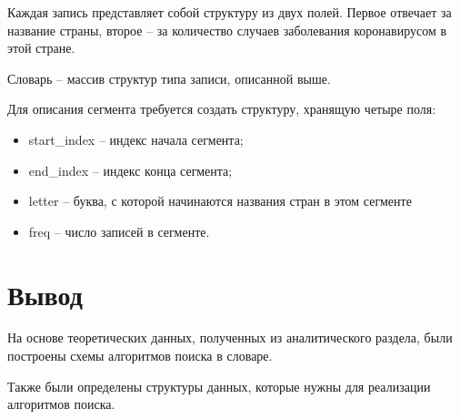 Каждая запись представляет собой структуру из двух полей. Первое отвечает за название страны, второе -- за количество случаев заболевания коронавирусом в этой стране.

Словарь -- массив структур типа записи, описанной выше.

Для описания сегмента требуется создать структуру, хранящую четыре поля:
\begin{itemize}
	\item start\_index -- индекс начала сегмента;
	\item end\_index -- индекс конца сегмента;
	\item letter -- буква, с которой начинаются названия стран в этом сегменте
	\item freq -- число записей в сегменте.
\end{itemize}

\section*{Вывод}

На основе теоретических данных, полученных из аналитического раздела, были построены схемы алгоритмов поиска в словаре. 

Также были определены структуры данных, которые нужны для реализации алгоритмов поиска.